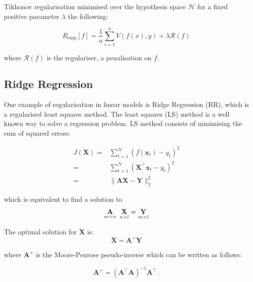 Tikhonov regularisation minimised over the hypothesis space $\mathcal{H}$ for a fixed positive parameter $\lambda$ the following:

\begin{equation} 
\label{eq:rerm}
R_{\text{emp}}[f] = \frac{1}{n} \sum_{i=1}^n V(f(x),y) + \lambda \mathcal{R}(f)
\end{equation}

\noindent where $\mathcal{R}(f)$ is the regulariser, a penalisation on $f$.




\subsection{Ridge Regression}



One example of regularisation in linear models is Ridge Regression (RR), which is a regularised least squares method.
The least squares (LS) method is a well known way to solve a regression
problem. 
LS method consists of minimising the sum of squared errors:

\begin{eqnarray*}
\label{eq:lsm}
 J(\mathbf{X}) =& \displaystyle \sum_{t=1}^N (f(\mathbf{x}_t)-y_t)^2 \\
 =&\displaystyle \sum_{t=1}^N (\mathbf{\mathbf{X}}^\top {\mathbf{x}}_t-y_t)^2 \\
 =& \| \mathbf{A}\mathbf{\mathbf{X}} - \mathbf{Y} \|_2^2 
\end{eqnarray*}

\noindent which is equivalent to find a solution to 
\begin{equation}
\label{eq:regproblem}
\underset{m \times n}{\mathbf{A}} \enskip \underset{n \times
l}{\mathbf{\mathbf{X}}} = \underset{m \times l}{\mathbf{Y}}
\end{equation}

The optimal solution for $\mathbf{\mathbf{X}}$ is:
\begin{equation}
\label{eq:MP}
\mathbf{\mathbf{X}}= \mathbf{A}^+ \mathbf{Y}
\end{equation}

\noindent where $\mathbf{A}^+$ is the Moore-Penrose pseudo-inverse
which can be written as follows: 

\begin{equation}
\label{eq:pseudoinverse}
\mathbf{A}^+= (\mathbf{A}^\top \mathbf{A})^{-1}\mathbf{A}^\top \, .
\end{equation}

